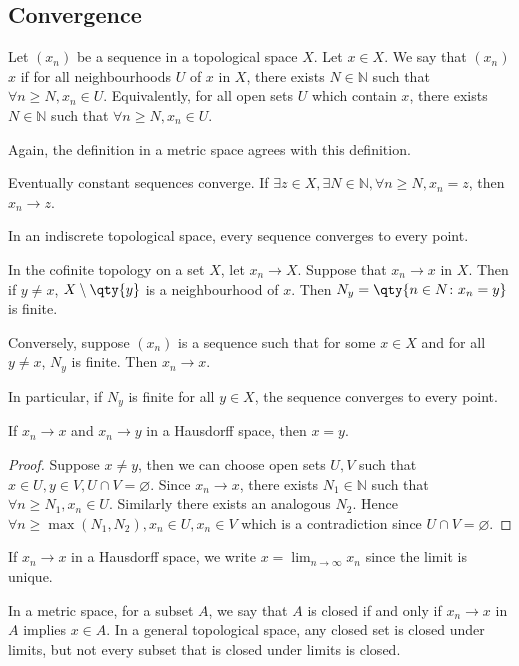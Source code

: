 \subsection{Convergence}
\begin{definition}
	Let \( (x_n) \) be a sequence in a topological space \( X \).
	Let \( x \in X \).
	We say that \( (x_n) \)  \( x \) if for all neighbourhoods \( U \) of \( x \) in \( X \), there exists \( N \in \mathbb N \) such that \( \forall n \geq N, x_n \in U \).
	Equivalently, for all open sets \( U \) which contain \( x \), there exists \( N \in \mathbb N \) such that \( \forall n \geq N, x_n \in U \).
\end{definition}
\begin{remark}
	Again, the definition in a metric space agrees with this definition.
\end{remark}
\begin{example}
	Eventually constant sequences converge.
	If \( \exists z \in X, \exists N \in \mathbb N, \forall n \geq N, x_n = z \), then \( x_n \to z \).
\end{example}
\begin{example}
	In an indiscrete topological space, every sequence converges to every point.
\end{example}
\begin{example}
	In the cofinite topology on a set \( X \), let \( x_n \to X \).
	Suppose that \( x_n \to x \) in \( X \).
	Then if \( y \neq x \), \( X \setminus \qty{y} \) is a neighbourhood of \( x \).
	Then \( N_y = \qty{n \in N \colon x_n = y} \) is finite.

	Conversely, suppose \( (x_n) \) is a sequence such that for some \( x \in X \) and for all \( y \neq x \), \( N_y \) is finite.
	Then \( x_n \to x \).

	In particular, if \( N_y \) is finite for all \( y \in X \), the sequence converges to every point.
\end{example}
\begin{proposition}
	If \( x_n \to x \) and \( x_n \to y \) in a Hausdorff space, then \( x = y \).
\end{proposition}
\begin{proof}
	Suppose \( x \neq y \), then we can choose open sets \( U, V \) such that \( x \in U, y \in V, U \cap V = \varnothing \).
	Since \( x_n \to x \), there exists \( N_1 \in \mathbb N \) such that \( \forall n \geq N_1, x_n \in U \).
	Similarly there exists an analogous \( N_2 \).
	Hence \( \forall n \geq \max(N_1, N_2), x_n \in U, x_n \in V \) which is a contradiction since \( U \cap V = \varnothing \).
\end{proof}
\begin{remark}
	If \( x_n \to x \) in a Hausdorff space, we write \( x = \lim_{n \to \infty} x_n \) since the limit is unique.
\end{remark}
\begin{remark}
	In a metric space, for a subset \( A \), we say that \( A \) is closed if and only if \( x_n \to x \) in \( A \) implies \( x \in A \).
	In a general topological space, any closed set is closed under limits, but not every subset that is closed under limits is closed.
\end{remark}

